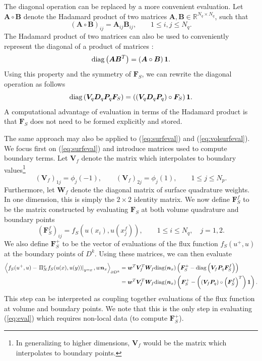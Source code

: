 \documentclass[preprint,10pt]{article}
\theoremstyle{definition}
\theoremstyle{lemma}
\theoremstyle{theorem}
\theoremstyle{assumption}
\newcommand{\LRp}[1]{\left( #1 \right)}
\newcommand{\LRa}[1]{\left\langle #1 \right\rangle}
\begin{document}
The diagonal operation can be replaced by a more convenient evaluation.  Let $\bm{A}\circ\bm{B}$ denote the Hadamard product of two matrices $\bm{A},\bm{B} \in \mathbb{R}^{N_q\times N_q}$, such that 
\[
\LRp{\bm{A}\circ\bm{B}}_{ij} = \bm{A}_{ij}\bm{B}_{ij}, \qquad 1\leq i,j \leq N_q.
\]
The Hadamard product of two matrices can also be used to conveniently represent the diagonal of a product of matrices \cite{styan1973hadamard}:
\[
{\rm diag}\LRp{\bm{A}\bm{B}^T} = \LRp{\bm{A}\circ \bm{B}}\bm{1}.  
\]
Using this property and the symmetry of $\bm{F}_S$, we can rewrite the diagonal operation as follows
\[
{\rm diag}\LRp{\bm{V}_q \bm{D}_q \bm{P}_q \bm{F}_S} = \LRp{\LRp{\bm{V}_q \bm{D}_q \bm{P}_q} \circ \bm{F}_S}\bm{1}.
\]
A computational advantage of evaluation in terms of the Hadamard product is that $\bm{F}_S$ does not need to be formed explicitly and stored.  

The same approach may also be applied to (\ref{eq:surfeval}) and (\ref{eq:volsurfeval}).  We focus first on (\ref{eq:surfeval}) and introduce matrices used to compute boundary terms.  Let $\bm{V}_f$ denote the matrix which interpolates to boundary values\footnote{In generalizing to higher dimensions, $\bm{V}_f$ would be the matrix which interpolates to boundary points.}
\[
\LRp{\bm{V}_f}_{1j} = \phi_j(-1), \qquad \LRp{\bm{V}_f}_{2j} = \phi_j(1), \qquad 1 \leq j \leq N_p.  
\]
Furthermore, let $\bm{W}_f$ denote the diagonal matrix of surface quadrature weights.  In one dimension, this is simply the $2\times 2$ identity matrix.  We now define $\bm{F}_S^f$ to be the matrix constructed by evaluating $\bm{F}_S$ at both volume quadrature and boundary points
\[
\LRp{\bm{F}_S^f}_{ij} = f_S\LRp{u(x_i),u\LRp{x^f_j}}, \qquad 1 \leq i \leq N_q, \quad j = 1,2.  
\]
We also define $\bm{F}^+_S$ to be the vector of evaluations of the flux function $f_S\LRp{u^+,u}$ at the boundary points of $D^k$.  Using these matrices, we can then evaluate 
\begin{align*}
\LRa{{f}_S({u}^+,{u})-\left.\Pi_N^x{f}_S({u}(x),{u}(y))\right|_{y=x},{w}\bm{n}_x}_{\partial D^k} &= \bm{w}^T\bm{V}_f^T \bm{W}_f {\rm diag}(\bm{n}_x)\LRp{\bm{F}_S^+ - {\rm diag}\LRp{\bm{V}_f\bm{P}_q \bm{F}^f_S}} \\
&= \bm{w}^T\bm{V}_f^T \bm{W}_f {\rm diag}(\bm{n}_x)\LRp{\bm{F}_S^+ - \LRp{\LRp{\bm{V}_f\bm{P}_q} \circ \LRp{\bm{F}^f_S}^T}\bm{1}}.
\end{align*}
This step can be interpreted as coupling together evaluations of the flux function at volume and boundary points.  We note that this is the only step in evaluating (\ref{eq:eval}) which requires non-local data (to compute $\bm{F}^+_S$).  
\end{document}
